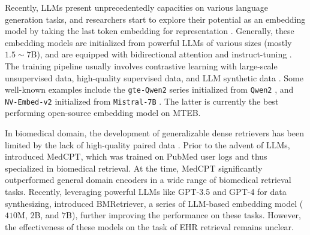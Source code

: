 Recently, LLMs present unprecedentedly capacities on various language generation tasks, and researchers start to explore their potential as an embedding model by taking the last token embedding for representation \cite{Ma2023FineTuningLF}.
Generally, these embedding models are initialized from powerful LLMs of various sizes (mostly $1.5\sim 7$B), and are equipped with bidirectional attention and instruct-tuning \cite{lee2024nv}.
The training pipeline usually involves contrastive learning with large-scale unsupervised data, high-quality supervised data, and LLM synthetic data \cite{lee2024nv}.
Some well-known examples include the \texttt{gte-Qwen2} series \cite{Li2023TowardsGT} initialized from \texttt{Qwen2} \cite{qwen2}, and \texttt{NV-Embed-v2} initialized from \texttt{Mistral-7B} \cite{Jiang2023Mistral7}.
The latter is currently the best performing open-source embedding model on MTEB.

In biomedical domain, the development of generalizable dense retrievers has been limited by the lack of high-quality paired data \cite{jin2023medcpt}.
Prior to the advent of LLMs, \citet{jin2023medcpt} introduced MedCPT, which was trained on PubMed user logs and thus specialized in biomedical retrieval.
At the time, MedCPT significantly outperformed general domain encoders in a wide range of biomedical retrieval tasks.
Recently, leveraging powerful LLMs like GPT-3.5 and GPT-4 for data synthesizing, \citet{xu2024bmretriever} introduced BMRetriever, a series of LLM-based embedding model ($410$M, $2$B, and $7$B), further improving the performance on these tasks.
However, the effectiveness of these models on the task of EHR retrieval remains unclear.